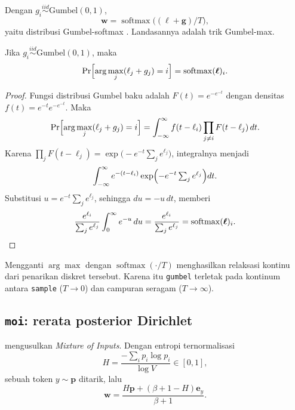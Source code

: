 \documentclass{laporanta1statugm}
\newcommand{\code}[1]{\texttt{#1}}
\begin{document}
Dengan $g_i \stackrel{iid}{\sim}\text{Gumbel}(0,1)$,
\begin{equation}
  \bm{w} = \operatorname{softmax}\bigl((\bm{\ell}+\bm{g})/T\bigr),
  \label{eq:gumbel}
\end{equation}
yaitu distribusi Gumbel-softmax \citep{softthinking}. Landasannya adalah trik
Gumbel-max.

\begin{teorema}
\label{teo:gumbelmax}
Jika $g_i\stackrel{iid}{\sim}\text{Gumbel}(0,1)$, maka
\[
  \Pr\Bigl[\arg\max_j(\ell_j+g_j) = i\Bigr]
  = \operatorname{softmax}(\bm{\ell})_i .
\]
\end{teorema}

\begin{proof}
Fungsi distribusi Gumbel baku adalah $F(t) = e^{-e^{-t}}$ dengan densitas
$f(t) = e^{-t}e^{-e^{-t}}$. Maka
\[
  \Pr\Bigl[\arg\max_j(\ell_j+g_j)=i\Bigr]
  = \int_{-\infty}^{\infty}
    f(t-\ell_i)\prod_{j\ne i}F(t-\ell_j)\,dt .
\]
Karena $\prod_{j}F(t-\ell_j) = \exp\bigl(-e^{-t}\sum_j e^{\ell_j}\bigr)$,
integralnya menjadi
\[
  \int_{-\infty}^{\infty} e^{-(t-\ell_i)}
  \exp\Bigl(-e^{-t}\textstyle\sum_j e^{\ell_j}\Bigr) dt .
\]
Substitusi $u = e^{-t}\sum_j e^{\ell_j}$, sehingga
$du = -u\,dt$, memberi
\[
  \frac{e^{\ell_i}}{\sum_j e^{\ell_j}}\int_{0}^{\infty} e^{-u}\,du
  = \frac{e^{\ell_i}}{\sum_j e^{\ell_j}} = \operatorname{softmax}(\bm{\ell})_i .
  \qedhere
\]
\end{proof}

Mengganti $\arg\max$ dengan $\operatorname{softmax}(\cdot/T)$ menghasilkan
relaksasi kontinu dari penarikan diskret tersebut. Karena itu \code{gumbel}
terletak pada kontinum antara \code{sample} ($T\to0$) dan campuran seragam
($T\to\infty$).

\subsection{\code{moi}: rerata posterior Dirichlet}

\citet{moi} mengusulkan \textit{Mixture of Inputs}. Dengan entropi
ternormalisasi
\begin{equation}
  H = \frac{-\sum_i p_i\log p_i}{\log V}\in[0,1],
  \label{eq:entropi}
\end{equation}
sebuah token $y\sim\bm{p}$ ditarik, lalu
\begin{equation}
  \bm{w} = \frac{H\bm{p} + (\beta+1-H)\bm{e}_y}{\beta+1}.
  \label{eq:moi}
\end{equation}
\end{document}
